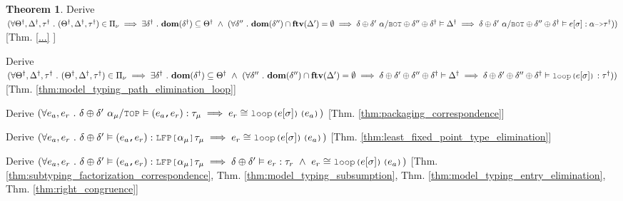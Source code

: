 \documentclass[acmsmall]{acmart}
\theoremstyle{definition}
\newtheorem{theorem}{Theorem}[section]
\begin{document}
\begin{theorem}
  \item \I\I \N Derive $(
    \forall \Theta^\dagger, \Delta^\dagger, \tau^\dagger \qua 
    (\Theta^\dagger, \Delta^\dagger, \tau^\dagger) \in \Pi_\nu \implies
    \exists \delta^\dagger \qua \textbf{dom}(\delta^\dagger) \subseteq \Theta^\dagger \up 
    (
    \forall \delta'' \qua
    \textbf{dom}(\delta'') \cap \textbf{ftv}(\Delta') = \emptyset \implies
    \delta \oplus \delta'\ \alpha \slash \J{BOT} \oplus \delta'' \oplus \delta^\dagger \satisfies \Delta^\dagger \implies
    \delta \oplus \delta'\ \alpha \slash \J{BOT} \oplus \delta'' \oplus \delta^\dagger \satisfies e[\sigma] \hastype \alpha \J{->} \tau^\dagger
    )
  )$ [Thm. \ref{...} ]

  \item \I\I \N Derive $(
    \forall \Theta^\dagger, \Delta^\dagger, \tau^\dagger \qua 
    (\Theta^\dagger, \Delta^\dagger, \tau^\dagger) \in \Pi_\nu \implies
    \exists \delta^\dagger \qua \textbf{dom}(\delta^\dagger) \subseteq \Theta^\dagger \up 
    (
    \forall \delta'' \qua
    \textbf{dom}(\delta'') \cap \textbf{ftv}(\Delta') = \emptyset \implies
    \delta \oplus \delta' \oplus \delta'' \oplus \delta^\dagger \satisfies \Delta^\dagger \implies
    \delta \oplus \delta' \oplus \delta'' \oplus \delta^\dagger \satisfies \J{loop(}e[\sigma]\J{)} \hastype \tau^\dagger
    )
  )$ [Thm. \ref{thm:model_typing_path_elimination_loop}]

  \item \I\I \N Derive $(
    \forall e_a, e_r \qua 
    \delta \oplus \delta'\ \alpha_\mu \slash \J{TOP} \satisfies (e_a\J{,}e_r) \hastype \tau_\mu
    \implies 
    e_r \cong \J{loop(}e[\sigma]\J{)(} e_a \J{)}
  )$ [Thm. \ref{thm:packaging_correspondence}]

  \item \I\I \N Derive $(
    \forall e_a, e_r \qua 
    \delta \oplus \delta' \satisfies (e_a\J{,}e_r) \hastype \J{LFP[}\alpha_\mu\J{]}\tau_\mu
    \implies 
    e_r \cong \J{loop(}e[\sigma]\J{)(} e_a \J{)}
  )$ [Thm. \ref{thm:least_fixed_point_type_elimination}]

  \item \I\I \N Derive $(
    \forall e_a, e_r \qua 
    \delta \oplus \delta' \satisfies (e_a\J{,}e_r) \hastype \J{LFP[}\alpha_\mu\J{]}\tau_\mu
    \implies 
    \delta \oplus \delta' \satisfies e_r \hastype \tau_r 
    \up
    e_r \cong \J{loop(}e[\sigma]\J{)(} e_a \J{)}
  )$ [Thm. \ref{thm:subtyping_factorization_correspondence},
      Thm. \ref{thm:model_typing_subsumption},
      Thm. \ref{thm:model_typing_entry_elimination},
      Thm. \ref{thm:right_congruence}]


\end{theorem}
\end{document}
